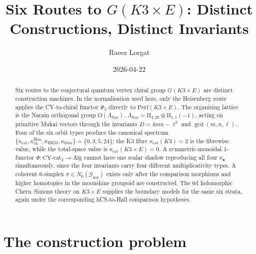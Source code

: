 \documentclass[11pt]{article}
\title{Six Routes to $G(K3 \times E)$: Distinct Constructions, Distinct Invariants}
\author{Raeez Lorgat}
\date{2026-04-22}
\begin{document}
\maketitle

\begin{abstract}
Six routes to the conjectural quantum vertex chiral group
$G(K3 \times E)$ are distinct construction machines. In the
normalisation used here, only the Heisenberg route applies the
CY-to-chiral functor $\Phi_3$ directly to
$\mathrm{Perf}(K3\times E)$. The organising lattice is the
Narain orthogonal group $O(\Lambda_{\mathrm{Nar}})$,
$\Lambda_{\mathrm{Nar}} = \mathrm{II}_{4,20} \oplus \mathrm{II}_{1,1}(-1)$,
acting on primitive Mukai vectors through the invariants
$D = 4mn-\ell^2$ and $\gcd(m,n,\ell)$. Four of the six orbit
types produce the canonical spectrum
$\{\kappa_{\mathrm{cat}}, \kappa_{\mathrm{ch}}^{\mathrm{Heis}},
\kappa_{\mathrm{BKM}}, \kappa_{\mathrm{fiber}}\}
= \{0, 3, 5, 24\}$;
the K3 fibre $\kappa_{\mathrm{cat}}(K3) = 2$ is the fibrewise value,
while the total-space value is
$\kappa_{\mathrm{cat}}(K3 \times E) = 0$. A symmetric-monoidal
$1$-functor $\Phi \colon \mathrm{CY\text{-}cat}_3 \to \mathrm{Alg}$
cannot have one scalar shadow reproducing all four $\kappa_\bullet$
simultaneously, since the four invariants carry four different
multiplicativity types. A coherent $6$-simplex
$\sigma \in N_6(\mathcal G_{\mathrm{mn}})$ exists only after the
comparison morphisms and higher homotopies in the moonshine groupoid
are constructed. The 6d holomorphic Chern--Simons theory on
$K3 \times E$ supplies the boundary models for the same six
strata, again under the corresponding hCS-to-Hall comparison
hypotheses.
\end{abstract}

\tableofcontents

\section{The construction problem}
\label{sec:intro}
\end{document}
